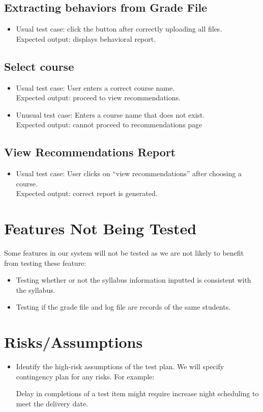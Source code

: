 \documentclass[12pt]{article}
\begin{document}
\subsection{Extracting behaviors from Grade File}
\begin{itemize}
	\item Usual test case: click the button after correctly uploading all files. \\
		Expected output: displays behavioral report.
\end{itemize}

\subsection{Select course}
\begin{itemize}
\item Usual test case: User enters a correct course name. \\
		Expected output: proceed to view recommendations.
		\item Unusual test case: Enters a course name that does not exist. \\
		Expected output: cannot proceed to recommendations page
\end{itemize}

\subsection{View Recommendations Report}
\begin{itemize}
	\item Usual test case: User clicks on “view recommendations” after choosing a course.\\
		Expected output: correct report is generated.
\end{itemize}

\section{Features Not Being Tested}
Some features in our system will not be tested as we are not likely to benefit from testing these feature:
\begin{itemize}
	\item Testing whether or not the syllabus information inputted is consistent with the syllabus.
	\item Testing if the grade file and log file are records of the same students.
\end{itemize}

\section{Risks/Assumptions}
\begin{itemize}
	\item Identify the high-risk assumptions of the test plan. We will specify contingency plan for any risks. For example:
	\begin{itemize}
	Delay in completions of a test item might require increase night scheduling to meet the delivery date.
	\end{itemize}
\end{itemize}
\end{document}
